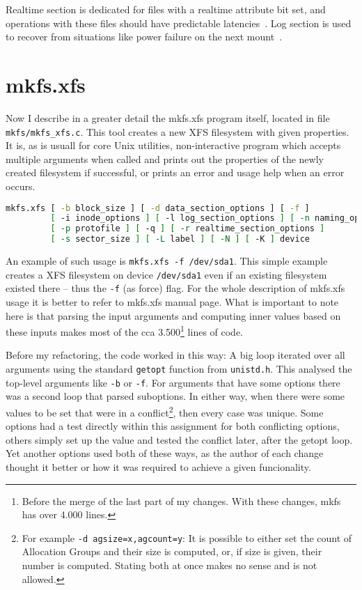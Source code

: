 Realtime section is dedicated for files with a realtime attribute bit set, and operations with these files should have predictable latencies~\cite{xfsRealtime}. Log section is used to recover from situations like power failure on the next mount~\cite{xfsStructure,xfsman}.


\section{mkfs.xfs}\label{chap:xfs:mkfs}
Now I describe in a greater detail the mkfs.xfs program itself, located in file {\tt mkfs/mkfs\_xfs.c}. This tool creates a new XFS filesystem with given properties. It is, as is usuall for core Unix utilities, non-interactive program which accepts multiple arguments when called and prints out the properties of the newly created filesystem if successful, or prints an error and usage help when an error occurs.

\begin{lstlisting}[frame=none, basicstyle=\footnotesize\ttfamily, language=Bash, numbers=none, numberstyle=\tiny\color{black},caption= {Synopsis of mkfs.xfs utility~\cite{mkfs.xfsMan}.}]
mkfs.xfs [ -b block_size ] [ -d data_section_options ] [ -f ]
         [ -i inode_options ] [ -l log_section_options ] [ -n naming_options ]
         [ -p protofile ] [ -q ] [ -r realtime_section_options ]
         [ -s sector_size ] [ -L label ] [ -N ] [ -K ] device
\end{lstlisting}

An example of such usage is {\tt mkfs.xfs -f /dev/sda1}. This simple example creates a XFS filesystem on device {\tt /dev/sda1} even if an existing filesystem existed there -- thus the {\tt -f} (as force) flag. For the whole description of mkfs.xfs usage it is better to refer to mkfs.xfs manual page. What is important to note here is that parsing the input arguments and computing inner values based on these inputs makes most of the cca 3.500\footnote{Before the merge of the last part of my changes. With these changes, mkfs has over 4.000 lines.} lines of code.

Before my refactoring, the code worked in this way: A big loop iterated over all arguments using the standard {\tt getopt} function from {\tt unistd.h}. This analysed the top-level arguments like {\tt -b} or {\tt -f}. For arguments that have some options there was a second loop that parsed suboptions. In either way, when there were some values to be set that were in a conflict\footnote{For example {\tt -d agsize=x,agcount=y}: It is possible to either set the count of Allocation Groups and their size is computed, or, if size is given, their number is computed. Stating both at once makes no sense and is not allowed.}, then every case was unique. Some options had a test directly within this assignment for both conflicting options, others simply set up the value and tested the conflict later, after the getopt loop. Yet another options used both of these ways, as the author of each change thought it better or how it was required to achieve a given funcionality.

